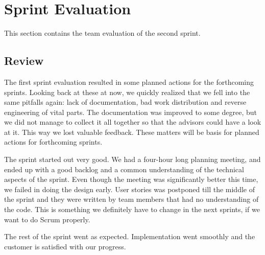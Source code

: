 \section{Sprint Evaluation}
\label{sec:sp2:eval}
This section contains the team evaluation of the second sprint.

\subsection{Review}
The first sprint evaluation resulted in some planned actions for the forthcoming sprints. Looking back at these at now, we quickly realized that we fell into the same pitfalls again: lack of documentation, bad work distribution and reverse engineering of vital parts. The documentation was improved to some degree, but we did not manage to collect it all together so that the advisors could have a look at it. This way we lost valuable feedback. These matters will be basis for planned actions for forthcoming sprints. 

The sprint started out very good. We had a four-hour long planning meeting, and ended up with a good backlog and a common understanding of the technical aspects of the sprint. Even though the meeting was significantly better this time, we failed in doing the design early. User stories was postponed till the middle of the sprint and they were written by team members that had no understanding of the code. This is something we definitely have to change in the next sprints, if we want to do Scrum properly.

The rest of the sprint went as expected. Implementation went smoothly and the customer is satisfied with our progress.


